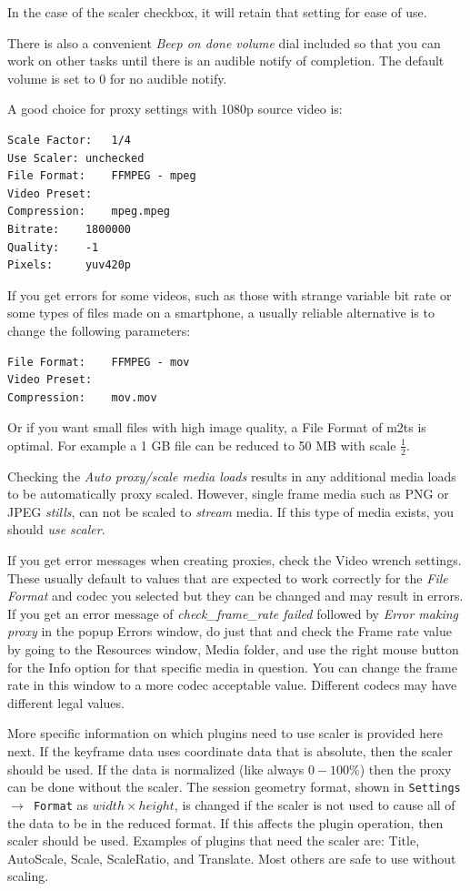 In the case of the scaler checkbox, it will retain that setting for ease of use.

There is also a convenient \textit{Beep on done volume} dial included so that you can work on other tasks until there is an audible notify of completion.  The default volume is set to 0 for no audible notify.

A good choice for proxy settings with 1080p source video is:

\begin{lstlisting}[numbers=none]
Scale Factor: 	1/4
Use Scaler:	unchecked
File Format:	FFMPEG - mpeg
Video Preset:
Compression:	mpeg.mpeg
Bitrate:	1800000
Quality:	-1
Pixels:		yuv420p
\end{lstlisting}

If you get errors for some videos, such as those with strange variable bit rate or some types of files made on a smartphone, a usually reliable alternative is to change the following parameters:

\begin{lstlisting}[numbers=none]
File Format:	FFMPEG - mov
Video Preset:
Compression:	mov.mov
\end{lstlisting}

Or if you want small files with high image quality, a File Format of m2ts is optimal.  For example a 1 GB file can be reduced to 50 MB with scale $\frac{1}{2}$. 

Checking the \textit{Auto proxy/scale media loads} results in any additional media loads to be automatically proxy scaled.  However, single frame media such as PNG or JPEG \textit{stills}, can not be scaled to \textit{stream} media.  If this type of media exists, you should \textit{use scaler}.

If you get error messages when creating proxies, check the Video wrench settings.  These usually default to values that are expected to work correctly for the \textit{File Format} and codec you selected but they can be changed and may result in errors.  If you get an error message of \textit{check\_frame\_rate failed} followed by \textit{Error making proxy} in the popup Errors window, do just that and check the Frame rate value by going to the Resources window, Media folder, and use the right mouse button for the Info option for that specific media in question.  You can change the frame rate in this window to a more codec acceptable value.  Different codecs may have different legal values.

More specific information on which plugins need to use scaler is provided here next.  If the keyframe data uses coordinate data that is absolute, then the scaler should be used.  If the data is normalized (like always $0-100\%$) then the proxy can be done without the scaler.  The session geometry format, shown in \texttt{Settings $\rightarrow$ Format} as $width \times height$, is changed if the scaler is not used to cause all of the data to be in the reduced format.  If this affects the plugin operation, then scaler should be used.  Examples of plugins that need the scaler are: Title, AutoScale, Scale, ScaleRatio, and Translate.  Most others are safe to use without scaling.

